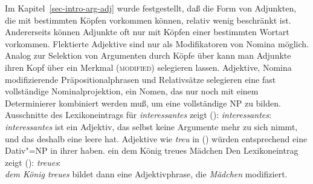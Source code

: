 Im Kapitel~\ref{sec-intro-arg-adj} wurde festgestellt, daß die Form von Adjunkten,
die mit bestimmten Köpfen vorkommen können, relativ wenig beschränkt ist. Andererseits
können Adjunkte oft nur mit Köpfen einer bestimmten Wortart vorkommen. Flektierte
Adjektive sind \zb nur als Modifikatoren von Nomina möglich. 
\eal
{}
\zl
Analog zur Selektion von Argumenten durch Köpfe über \subcat kann
man Adjunkte ihren Kopf über ein Merkmal (\textsc{modified}) selegieren lassen.
Adjektive, Nomina modifizierende Präpositionalphrasen und Relativsätze
selegieren eine fast vollständige Nominalprojektion, \dash ein Nomen, das
nur noch mit einem Determinierer kombiniert werden muß, um eine vollständige
NP zu bilden. Ausschnitte des Lexikoneintrags für \emph{interessantes} zeigt ():
\ea{}
\label{le-interessantes}
\emph{interessantes}:\\
\z
\enlargethispage{\baselineskip}
\emph{interessantes} ist ein Adjektiv, das selbst keine Argumente mehr zu sich nimmt,
und das deshalb eine leere \subcatl hat. Adjektive wie \emph{treu} in () würden entsprechend
eine Dativ"=NP in ihrer \subcatl haben.
\ea
ein dem König treues Mädchen
\z
Den Lexikoneintrag zeigt ():
\ea
\label{le-treue}
\emph{treues}:\\
\z
\emph{dem König treues} bildet dann eine Adjektivphrase, die \emph{Mädchen} modifiziert.
\pagebreak

